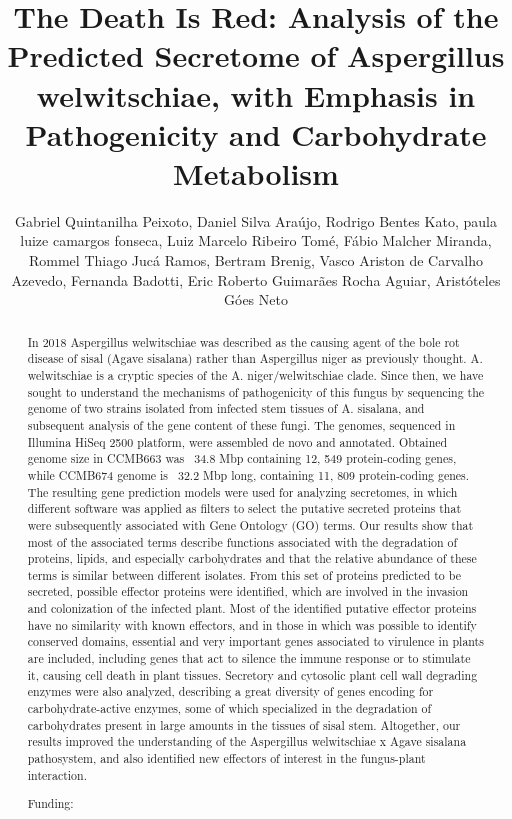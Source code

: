 \documentclass[twoside]{article}
\title{\vspace{-15mm}\fontsize{24pt}{10pt}\selectfont\textbf{ The Death Is Red: Analysis of the Predicted Secretome of Aspergillus welwitschiae,  with Emphasis in Pathogenicity and Carbohydrate Metabolism }} %
\author{ Gabriel Quintanilha Peixoto, Daniel Silva Ara\'ujo, Rodrigo Bentes Kato, paula  luize camargos fonseca, Luiz Marcelo Ribeiro Tom\'e, F\'abio Malcher Miranda, Rommel Thiago Juc\'a Ramos, Bertram Brenig, Vasco Ariston de Carvalho Azevedo, Fernanda Badotti, Eric Roberto Guimar\~aes Rocha Aguiar, Arist\'oteles G\'oes Neto }
\affil{ University G\"ottingen }
\date{}
\begin{document}
  
  
  \maketitle %
  
  
  \thispagestyle{fancy} %
  
  
  \begin{abstract}
  In 2018 Aspergillus welwitschiae was described as the causing agent of the bole rot disease of sisal (Agave sisalana) rather than Aspergillus niger as previously thought. A. welwitschiae is a cryptic species of the A. niger/welwitschiae clade. Since then,  we have sought to understand the mechanisms of pathogenicity of this fungus by sequencing the genome of two strains isolated from infected stem tissues of A. sisalana,   and subsequent analysis of the gene content of these fungi. The genomes,  sequenced in Illumina HiSeq 2500 platform,  were assembled de novo and annotated. Obtained genome size in CCMB663 was ~34.8 Mbp containing 12, 549 protein-coding genes,  while CCMB674 genome is ~32.2 Mbp long,  containing 11, 809 protein-coding genes. The resulting gene prediction models were used for analyzing secretomes,  in which different software was applied as filters to select the putative secreted proteins that were subsequently associated with Gene Ontology (GO) terms. Our results show that most of the associated terms describe functions associated with the degradation of proteins,  lipids,  and especially carbohydrates and that the relative abundance of these terms is similar between different isolates. From this set of proteins predicted to be secreted,  possible effector proteins were identified,  which are involved in the invasion and colonization of the infected plant. Most of the identified putative effector proteins have no similarity with known effectors,  and in those in which was possible to identify conserved domains,  essential and very important genes associated to virulence in plants are included,  including genes that act to silence the immune response or to stimulate it,  causing cell death in plant tissues. Secretory and cytosolic plant cell wall degrading enzymes were also analyzed,  describing a great diversity of genes encoding for carbohydrate-active enzymes,  some of which specialized in the degradation of carbohydrates present in large amounts in the tissues of sisal stem. Altogether,  our results improved the understanding of the Aspergillus welwitschiae x Agave sisalana pathosystem,  and also identified new effectors of interest in the fungus-plant interaction.
  
  Funding:  \\ 
  \end{abstract}
  
\end{document}
